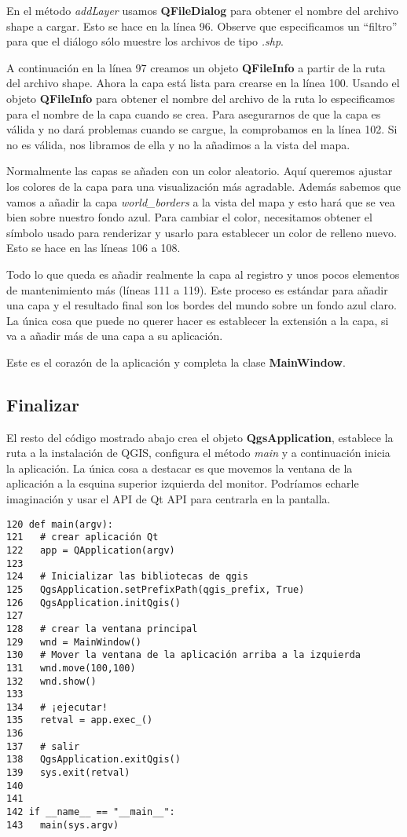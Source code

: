En el método \textsl{addLayer} usamos \textbf{QFileDialog} para obtener el nombre del archivo shape a cargar. 
Esto se hace en la línea 96. Observe que especificamos un ``filtro'' para que el diálogo sólo muestre los archivos 
de tipo \textsl{.shp}.

A continuación en la línea 97 creamos un objeto \textbf{QFileInfo} a partir de la ruta del archivo shape. Ahora la 
capa está lista para crearse en la línea 100. Usando el objeto \textbf{QFileInfo} para obtener el nombre 
del archivo de la ruta lo especificamos para el nombre de la capa cuando se crea. Para asegurarnos de que la 
capa es válida y no dará problemas cuando se cargue, la comprobamos en la línea 102. Si no es válida, nos libramos de ella 
y no la añadimos a la vista del mapa.

Normalmente las capas se añaden con un color aleatorio. Aquí queremos ajustar los colores de la capa para una visualización 
más agradable. Además sabemos que vamos a añadir la capa \textsl{world\_borders} a la vista del mapa y esto hará que 
se vea bien sobre nuestro fondo azul. Para cambiar el color, necesitamos obtener el símbolo usado para renderizar y 
usarlo para establecer un color de relleno nuevo. Esto se hace en las líneas 106 a 108. 

Todo lo que queda es añadir realmente la capa al registro y unos pocos elementos de mantenimiento más (líneas 111 a 119). 
Este proceso es estándar para añadir una capa y el resultado final son los bordes del mundo sobre un fondo azul 
claro. La única cosa que puede no querer hacer es establecer la extensión a la capa, si va a añadir más de una capa 
a su aplicación.

Este es el corazón de la aplicación y completa la clase \textbf{MainWindow}.

\subsection{Finalizar}

El resto del código mostrado abajo crea el objeto \textbf{QgsApplication}, establece la ruta a la instalación de 
QGIS, configura el método \textsl{main} y a continuación inicia la aplicación. La única cosa a destacar es que 
movemos la ventana de la aplicación a la esquina superior izquierda del monitor. Podríamos echarle imaginación y usar el API 
de Qt API para centrarla en la pantalla.

\begin{verbatim}
120 def main(argv):
121   # crear aplicación Qt
122   app = QApplication(argv)
123 
124   # Inicializar las bibliotecas de qgis
125   QgsApplication.setPrefixPath(qgis_prefix, True)
126   QgsApplication.initQgis()
127 
128   # crear la ventana principal
129   wnd = MainWindow()
130   # Mover la ventana de la aplicación arriba a la izquierda
131   wnd.move(100,100)
132   wnd.show()
133 
134   # ¡ejecutar!
135   retval = app.exec_()
136   
137   # salir
138   QgsApplication.exitQgis()
139   sys.exit(retval)
140 
141 
142 if __name__ == "__main__":
143   main(sys.argv)
\end{verbatim}

